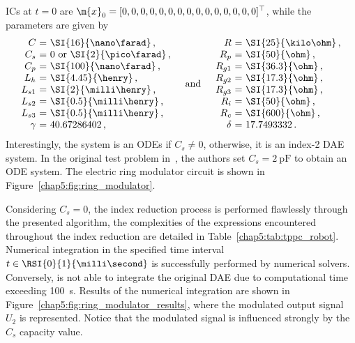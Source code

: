 %
\acp{IC} at $t = 0$ are $\m{x}_0 = [0, 0, 0, 0, 0, 0, 0, 0, 0, 0, 0, 0, 0, 0, 0]^\top$, while the parameters are given by
%
\begin{equation*}
  \begin{array}{r@{~}c@{~}l}
    C      &=& \SI{16}{\nano\farad} \, \text{,} \\
    C_s    &=& 0~\text{or}~\SI{2}{\pico\farad} \, \text{,} \\
    C_p    &=& \SI{100}{\nano\farad} \, \text{,} \\
    L_h    &=& \SI{4.45}{\henry} \, \text{,} \\
    L_{s1} &=& \SI{2}{\milli\henry} \, \text{,} \\
    L_{s2} &=& \SI{0.5}{\milli\henry} \, \text{,} \\
    L_{s3} &=& \SI{0.5}{\milli\henry} \, \text{,} \\
    \gamma &=& 40.67286402 \, \text{,} \\
  \end{array}
  \quad \text{and} \quad
  \begin{array}{r@{~}c@{~}l}
    R      &=& \SI{25}{\kilo\ohm} \, \text{,} \\
    R_p    &=& \SI{50}{\ohm} \, \text{,} \\
    R_{g1} &=& \SI{36.3}{\ohm} \, \text{,} \\
    R_{g2} &=& \SI{17.3}{\ohm} \, \text{,} \\
    R_{g3} &=& \SI{17.3}{\ohm} \, \text{,} \\
    R_{i}  &=& \SI{50}{\ohm} \, \text{,} \\
    R_{c}  &=& \SI{600}{\ohm} \, \text{,} \\
    \delta &=& 17.7493332 \, \text{.} \\
  \end{array}
\end{equation*}
%
Interestingly, the system is an \acp{ODE} if $C_s \neq 0$, otherwise, it is an index-2 \ac{DAE} system. In the original test problem in~\cite{lioen1998test, mazzia2008test}, the authors set $C_s = \SI{2}{\pico\farad}$ to obtain an \ac{ODE} system. The electric ring modulator circuit is shown in Figure~\ref{chap5:fig:ring_modulator}.

Considering $C_s = 0$, the index reduction process is performed flawlessly through the presented algorithm, the complexities of the expressions encountered throughout the index reduction are detailed in Table~\ref{chap5:tab:tppc_robot}. Numerical integration in the specified time interval $t \in \RSI{0}{1}{\milli\second}$ is successfully performed by \Indigo{} numerical solvers. Conversely, \Maple{} is not able to integrate the original \ac{DAE} due to computational time exceeding \SI{100}{\second}. Results of the numerical integration are shown in Figure~\ref{chap5:fig:ring_modulator_results}, where the modulated output signal $U_2$ is represented. Notice that the modulated signal is influenced strongly by the $C_s$ capacity value.

